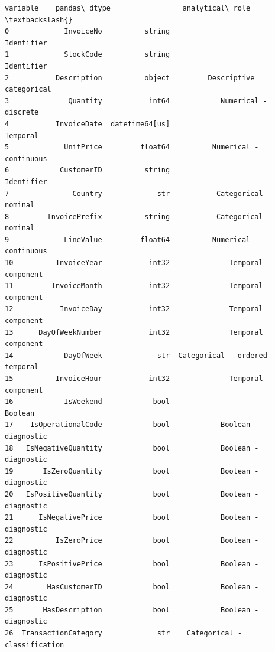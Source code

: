 \documentclass[11pt]{article}
\begin{document}
    
    \begin{Verbatim}[commandchars=\\\{\}]
               variable    pandas\_dtype                 analytical\_role  \textbackslash{}
0             InvoiceNo          string                      Identifier   
1             StockCode          string                      Identifier   
2           Description          object         Descriptive categorical   
3              Quantity           int64            Numerical - discrete   
4           InvoiceDate  datetime64[us]                        Temporal   
5             UnitPrice         float64          Numerical - continuous   
6            CustomerID          string                      Identifier   
7               Country             str           Categorical - nominal   
8         InvoicePrefix          string           Categorical - nominal   
9             LineValue         float64          Numerical - continuous   
10          InvoiceYear           int32              Temporal component   
11         InvoiceMonth           int32              Temporal component   
12           InvoiceDay           int32              Temporal component   
13      DayOfWeekNumber           int32              Temporal component   
14            DayOfWeek             str  Categorical - ordered temporal   
15          InvoiceHour           int32              Temporal component   
16            IsWeekend            bool                         Boolean   
17    IsOperationalCode            bool            Boolean - diagnostic   
18   IsNegativeQuantity            bool            Boolean - diagnostic   
19       IsZeroQuantity            bool            Boolean - diagnostic   
20   IsPositiveQuantity            bool            Boolean - diagnostic   
21      IsNegativePrice            bool            Boolean - diagnostic   
22          IsZeroPrice            bool            Boolean - diagnostic   
23      IsPositivePrice            bool            Boolean - diagnostic   
24        HasCustomerID            bool            Boolean - diagnostic   
25       HasDescription            bool            Boolean - diagnostic   
26  TransactionCategory             str    Categorical - classification   


\end{Verbatim}
\end{document}
